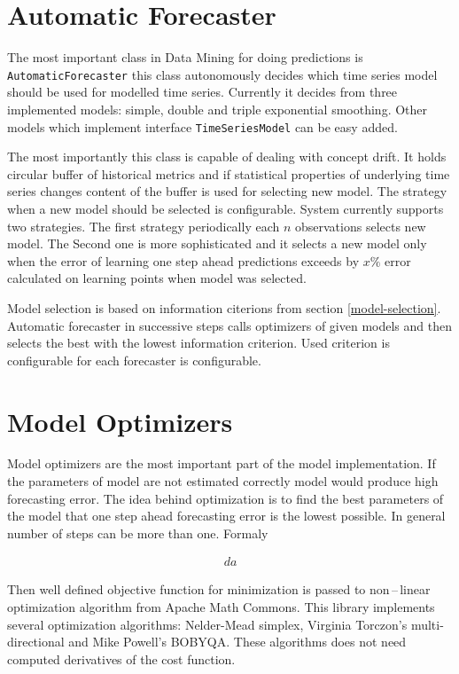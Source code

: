     \section{Automatic Forecaster}
    The most important class in Data Mining for doing predictions is \texttt{AutomaticForecaster} this class
    autonomously decides which time series model should be used for modelled time series. Currently it decides from
    three implemented models: simple, double and triple exponential smoothing. Other models which implement interface
    \texttt{TimeSeriesModel} can be easy added.

    The most importantly this class is capable of dealing with concept drift. It holds circular buffer of historical
    metrics and if statistical properties of underlying time series changes content of the buffer is used for selecting
    new model. The strategy when a new model should be selected is configurable. System currently supports two
    strategies. The first strategy periodically each $n$ observations selects new model.
    The Second one is more sophisticated and it selects a new model only when the error of learning one step
    ahead predictions exceeds by $x\%$ error calculated on learning points when model was selected.

    Model selection is based on information citerions from section \ref{model-selection}. Automatic forecaster in
    successive steps calls optimizers of given models and then selects the best with the lowest information criterion.
    Used criterion is configurable for each forecaster is configurable.

    \section{Model Optimizers} %
    Model optimizers are the most important part of the model implementation. If the parameters of model are not
    estimated correctly model would produce high forecasting error. The idea behind optimization is to find the
    best parameters of the model that one step ahead forecasting error is the lowest possible. In general number of
    steps can be more than one. Formaly %

    \begin{eqnarray} \label{likelihood}
da
    \end{eqnarray}

    Then well defined objective function for minimization is passed to non\,--\,linear optimization algorithm from
    Apache Math Commons. This library implements several optimization algorithms: Nelder-Mead simplex,
    Virginia Torczon's multi-directional and Mike Powell's BOBYQA. These algorithms does not need computed derivatives
    of the cost function.

